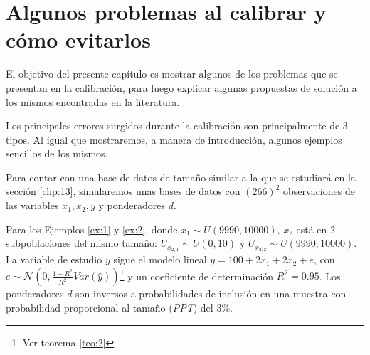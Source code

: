\documentclass[a4paper,twoside,openright,12pt]{book}
\theoremstyle{definition}
\numberwithin{equation}{chapter}
\numberwithin{figure}{chapter}
\numberwithin{table}{chapter}
\numberwithin{theorem}{chapter}
\numberwithin{lemma}{chapter}
\begin{document}
\chapter{Algunos problemas al calibrar y cómo evitarlos}\label{sec:10}
El objetivo del presente capítulo es mostrar algunos de los problemas que se presentan en la calibración, para luego explicar algunas propuestas de solución a los mismos encontradas en la literatura.

Los principales errores surgidos durante la calibración son principalmente de 3 tipos. %
Al igual que \cite{CIS-112732} mostraremos, a manera de introducción, algunos ejemplos sencillos de los mismos.

Para contar con una base de datos de tamaño similar a la que  se estudiará en la sección \ref{chp:13}, simularemos unas bases de datos con $(266)^2$ observaciones de las variables $x_1, x_2, y$ y ponderadores $d$.

Para los Ejemplos \ref{ex:1} y \ref{ex:2}, donde $x_1\sim U(9990, 10000)$, $x_2$ está en 2 subpoblaciones del mismo tamaño: $U_{x_{2,1}}\sim U(0,10)$ y $U_{x_{2,2}}\sim U(9990, 10000)$. La variable de estudio $y$ sigue el modelo lineal $y=100+2x_1+2x_2+e$, con $e\sim\mathcal N\left(0,\frac{1-R^2}{R^2}Var(\hat y)\right)$\footnote{Ver teorema \ref{teo:2}} y un coeficiente de determinación $R^2=0.95$. Los ponderadores $d$ son inversos a probabilidades de inclusión en una muestra con probabilidad proporcional al tamaño (\textsl{PPT}) del $3\%$.
\end{document}
